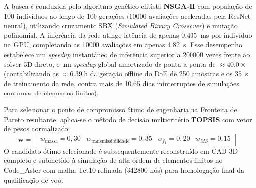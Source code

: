 A busca é conduzida pelo algoritmo genético elitista \textbf{NSGA-II} com população de 100 indivíduos ao longo de 100 gerações (\num{10000} avaliações aceleradas pela ResNet neural), utilizando cruzamento SBX (\textit{Simulated Binary Crossover}) e mutação polinomial. A inferência da rede atinge latência de apenas \SI{0.405}{\milli\second} por indivíduo na GPU, completando as \num{10000} avaliações em apenas \SI{4.82}{\second}. Esse desempenho estabelece um \textit{speedup} instantâneo de inferência superior a \num{200000} vezes frente ao solver 3D direto, e um \textit{speedup} global amortizado de ponta a ponta de $\approx \num{40.0}\times$ (contabilizando as $\approx \SI{6.39}{\hour}$ da geração offline do DoE de 250 amostras e os \SI{35}{\second} de treinamento da rede, contra mais de \num{10.65} dias ininterruptos de simulações contínuas de elementos finitos).

Para selecionar o ponto de compromisso ótimo de engenharia na Fronteira de Pareto resultante, aplica-se o método de decisão multicritério \textbf{TOPSIS} com vetor de pesos normalizado:
\begin{equation}
  \mathbf{w} = \begin{bmatrix} w_{\text{massa}} = 0{,}30 & w_{\text{transmissibilidade}} = 0{,}35 & w_{f_1} = 0{,}20 & w_{MS} = 0{,}15 \end{bmatrix}
  \label{eq:pesos-topsis}
\end{equation}
O candidato ótimo selecionado é subsequentemente reconstruído em CAD 3D completo e submetido à simulação de alta ordem de elementos finitos no Code\_Aster com malha Tet10 refinada (\num{342800} nós) para homologação final da qualificação de voo.
